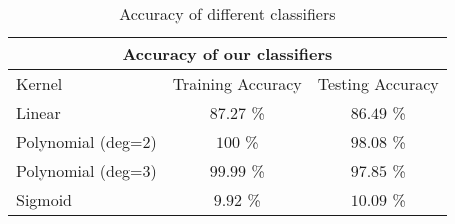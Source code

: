 \begin{table*}[!tb]
	\centering
	\begin{tabular}{lcc}
		\toprule
		\multicolumn{3}{c}{\textbf{Accuracy of our classifiers}} \\
		\midrule
		Kernel & Training Accuracy & Testing Accuracy \\
		\midrule
		Linear & $87.27$ \% & $86.49$ \% \\
		Polynomial (deg=$2$) & $100$ \% & $98.08$ \% \\
		Polynomial (deg=$3$) & $99.99$ \% & $97.85$ \% \\
		Sigmoid & $9.92$ \% & $10.09$ \% \\
		\bottomrule
	\end{tabular}
	\caption{Accuracy of different classifiers}
	\label{tab:results}
\end{table*}